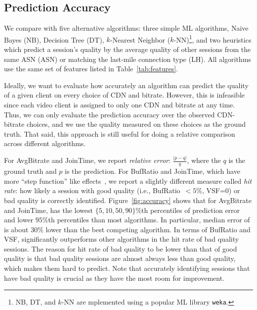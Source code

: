 \subsection{Prediction Accuracy}
\label{subsec:eval-accuracy}
We compare \dda with five alternative algorithms: three
simple ML algorithms, Naive Bayes (NB), Decision Tree (DT),
$k$-Nearest Neighbor ($k$-NN)\footnote{NB, DT, and 
$k$-NN are mplemented using a popular ML
library \texttt{weka}\cite{weka}.}, and two heuristics 
 which predict a session's quality by the average quality 
of other sessions from the same ASN (ASN) or matching 
the last-mile connection type (LH). 
All algorithms use the same set of features listed in 
Table~\ref{tab:features}.



Ideally, we want to evaluate how accurately an algorithm 
can predict the quality of a given client on every choice 
of CDN and bitrate. 
However,  this is infeasible since each video client is 
assigned to only one CDN and bitrate at any time.
Thus,  we  can only evaluate the prediction accuracy 
over the observed CDN-bitrate choices, and we use the 
quality measured on these choices as the ground truth.
That said, this approach is still useful for doing a relative 
comparison across different algorithms.  

For AvgBitrate and JoinTime, we report {\em relative error}:
$\frac{|p-q|}{q}$, where the $q$ is the ground truth and 
$p$ is the prediction.
For  BufRatio and JoinTime, which have more ``step 
function'' like effects~\cite{sigcomm11}, we report a 
slightly different measure called {\em hit rate}:
how likely a session with good quality (i.e., 
BufRatio~$<5\%$, VSF=0) or bad quality is correctly 
identified. 
Figure~\ref{fig:accuracy} shows that for AvgBitrate and
JoinTime, \dda has the lowest $\{5,10,50,90\}\%$th 
percentiles of prediction error and lower $95\%$th 
percentiles than most algorithms.  
In particular, median error of \dda is about 30\% lower 
than the best competing  algorithm.  
In terms of BufRatio and VSF, \dda significantly 
outperforms other algorithms in the hit rate of bad 
quality sessions. 
The reason  for hit rate of bad quality to be lower than 
that of good quality is that bad quality sessions are 
almost always less than good quality, which makes 
them hard to predict.
Note that accurately identifying sessions that have bad 
quality is crucial as they have the most room for 
improvement.



